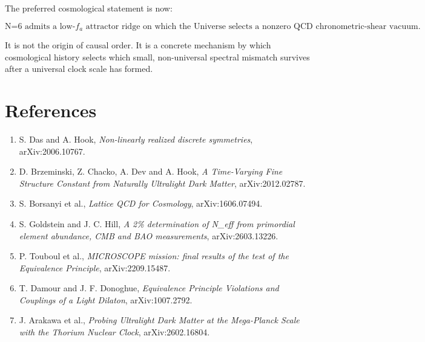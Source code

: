 \documentclass[
  10pt,
]{article}
\providecommand{\tightlist}{%
  \setlength{\itemsep}{0pt}\setlength{\parskip}{0pt}}
\begin{document}
The preferred cosmological statement is now:

\[
\boxed{
\text{N=6 admits a low-}f_a\text{ attractor ridge on which the Universe}
\text{ selects a nonzero QCD chronometric-shear vacuum.}
}
\]

It is not the origin of causal order. It is a concrete mechanism by
which cosmological history selects which small, non-universal spectral
mismatch survives after a universal clock scale has formed.

\section{References}\label{references}

\begin{enumerate}
\def\labelenumi{\arabic{enumi}.}
\tightlist
\item
  S. Das and A. Hook, \emph{Non-linearly realized discrete symmetries},
  arXiv:2006.10767.
\item
  D. Brzeminski, Z. Chacko, A. Dev and A. Hook, \emph{A Time-Varying
  Fine Structure Constant from Naturally Ultralight Dark Matter},
  arXiv:2012.02787.
\item
  S. Borsanyi et al., \emph{Lattice QCD for Cosmology},
  arXiv:1606.07494.
\item
  S. Goldstein and J. C. Hill, \emph{A 2\% determination of N\_eff from
  primordial element abundance, CMB and BAO measurements},
  arXiv:2603.13226.
\item
  P. Touboul et al., \emph{MICROSCOPE mission: final results of the test
  of the Equivalence Principle}, arXiv:2209.15487.
\item
  T. Damour and J. F. Donoghue, \emph{Equivalence Principle Violations
  and Couplings of a Light Dilaton}, arXiv:1007.2792.
\item
  J. Arakawa et al., \emph{Probing Ultralight Dark Matter at the
  Mega-Planck Scale with the Thorium Nuclear Clock}, arXiv:2602.16804.
\end{enumerate}
\end{document}
